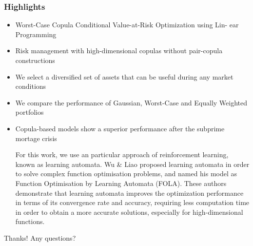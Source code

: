 \documentclass[pdf,10pt,xcolor=dvipsnames,hide notes]{beamer}
\begin{document}
		\begin{frame}[label=frame9e]
		\frametitle{Highlights}
		
		\begin{itemize}
			\justifying
		
		\item Worst-Case Copula Conditional Value-at-Risk Optimization using Lin-
		ear Programming
		
		\vspace{0.3cm}
		
		\item Risk management with high-dimensional copulas without pair-copula
		constructions
		
		\vspace{0.3cm}
		
		\item We select a diversified set of assets that can be useful during any market conditions
		
		\vspace{0.3cm}
		
		\item We compare the performance of Gaussian, Worst-Case and Equally
		Weighted portfolios
		
		\vspace{0.3cm}
		
		\item Copula-based models show a superior performance after the subprime
		mortage crisis
		
		For this work, we use an particular approach of reinforcement learning, known as learning automata. Wu \& Liao \cite{Wu:2013} proposed learning automata in order to solve complex function optimisation problems, and named his model as Function Optimisation by Learning Automata (FOLA). These authors demonstrate that learning automata improves the optimization performance in terms of its convergence rate and accuracy, requiring less computation time in order to obtain a more accurate solutions, especially for high-dimensional functions.
		
		\end{itemize}
	
\end{frame}


\begin{frame}

\centering
\Large{Thanks! Any questions?}

\end{frame}
\end{document}
